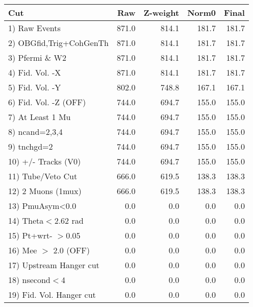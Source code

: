  \begin{table}[h!]\centering
 \begin{tabular}{||l||r|r|r|r||}
 \hline
 \hline
 Cut & Raw & Z-weight & Norm0 & Final \\
 \hline
  1) Raw Events           &       871.0 &       814.1 &       181.7 &       181.7 \\
  2) OBGfid,Trig+CohGenTh &       871.0 &       814.1 &       181.7 &       181.7 \\
  3) Pfermi \& W2         &       871.0 &       814.1 &       181.7 &       181.7 \\
  4) Fid. Vol. -X         &       871.0 &       814.1 &       181.7 &       181.7 \\
  5) Fid. Vol. -Y         &       802.0 &       748.8 &       167.1 &       167.1 \\
  6) Fid. Vol. -Z (OFF)   &       744.0 &       694.7 &       155.0 &       155.0 \\
  7) At Least 1 Mu        &       744.0 &       694.7 &       155.0 &       155.0 \\
  8) ncand=2,3,4          &       744.0 &       694.7 &       155.0 &       155.0 \\
  9) tnchgd=2             &       744.0 &       694.7 &       155.0 &       155.0 \\
 10) +/- Tracks (V0)      &       744.0 &       694.7 &       155.0 &       155.0 \\
 11) Tube/Veto Cut        &       666.0 &       619.5 &       138.3 &       138.3 \\
 12) 2 Muons (1mux)       &       666.0 &       619.5 &       138.3 &       138.3 \\
 13) PmuAsym<0.0          &         0.0 &         0.0 &         0.0 &         0.0 \\
 14) Theta$<$2.62 rad     &         0.0 &         0.0 &         0.0 &         0.0 \\
 15) Pt+wrt- $>$0.05      &         0.0 &         0.0 &         0.0 &         0.0 \\
 16) Mee $>$ 2.0  (OFF)   &         0.0 &         0.0 &         0.0 &         0.0 \\
 17) Upstream Hanger cut  &         0.0 &         0.0 &         0.0 &         0.0 \\
 18) nsecond$<$4          &         0.0 &         0.0 &         0.0 &         0.0 \\
 19) Fid. Vol. Hanger cut &         0.0 &         0.0 &         0.0 &         0.0 \\

\end{tabular}
\end{table}
